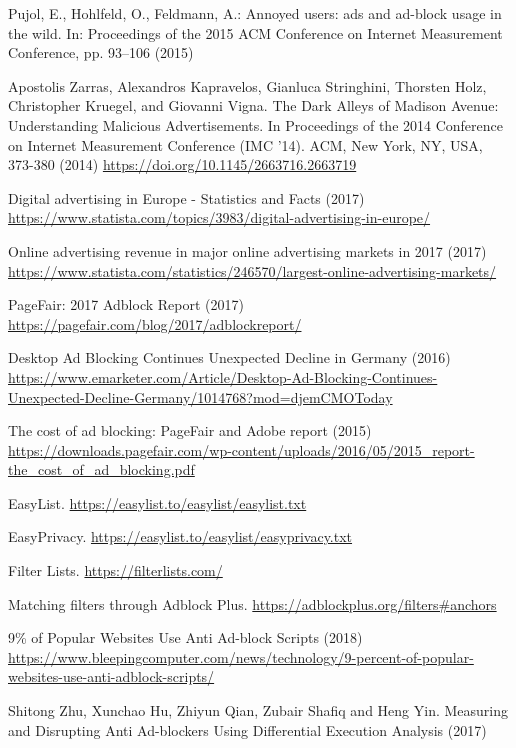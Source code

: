 \documentclass[runningheads,a4paper]{llncs}
\begin{document}
\begin{thebibliography}{x}
 Pujol, E., Hohlfeld, O., Feldmann, A.: Annoyed users: ads and ad-block usage in the wild. In: Proceedings of the 2015 ACM Conference on Internet Measurement Conference, pp. 93–106 (2015)

 Apostolis Zarras, Alexandros Kapravelos, Gianluca Stringhini, Thorsten Holz, Christopher Kruegel, and Giovanni Vigna. The Dark Alleys of Madison Avenue: Understanding Malicious Advertisements. In Proceedings of the 2014 Conference on Internet Measurement Conference (IMC '14). ACM, New York, NY, USA, 373-380 (2014) \url{https://doi.org/10.1145/2663716.2663719}

 Digital advertising in Europe - Statistics and Facts (2017) \url{https://www.statista.com/topics/3983/digital-advertising-in-europe/}

 Online advertising revenue in major online advertising markets in 2017 (2017) \url{https://www.statista.com/statistics/246570/largest-online-advertising-markets/}

 PageFair: 2017 Adblock Report (2017) \url{https://pagefair.com/blog/2017/adblockreport/}

 Desktop Ad Blocking Continues Unexpected Decline in Germany (2016) \url{https://www.emarketer.com/Article/Desktop-Ad-Blocking-Continues-Unexpected-Decline-Germany/1014768?mod=djemCMOToday}

 The cost of ad blocking: PageFair and Adobe report (2015) \url{https://downloads.pagefair.com/wp-content/uploads/2016/05/2015_report-the_cost_of_ad_blocking.pdf}

 EasyList. \url{https://easylist.to/easylist/easylist.txt}

 EasyPrivacy. \url{https://easylist.to/easylist/easyprivacy.txt}

 Filter Lists. \url{https://filterlists.com/}

 Matching filters through Adblock Plus. \url{https://adblockplus.org/filters#anchors}

 9\% of Popular Websites Use Anti Ad-block Scripts (2018) \url{https://www.bleepingcomputer.com/news/technology/9-percent-of-popular-websites-use-anti-adblock-scripts/}

 Shitong Zhu, Xunchao Hu, Zhiyun Qian, Zubair Shafiq and Heng Yin. Measuring and Disrupting Anti Ad-blockers Using Differential Execution Analysis (2017)


\end{thebibliography}
\end{document}

